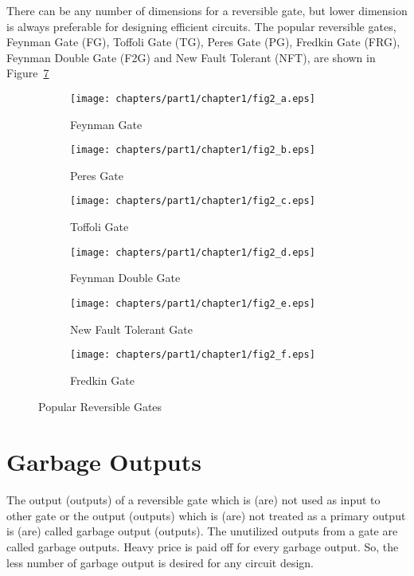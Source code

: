 \begin{example}\textnormal{
	There can be any number of dimensions for a reversible gate, but lower dimension is always preferable for designing efficient circuits. The popular reversible gates, Feynman Gate (FG), Toffoli Gate (TG), Peres Gate (PG), Fredkin Gate (FRG), Feynman Double Gate (F2G) and New Fault Tolerant (NFT), are shown in Figure~\ref{fig:p1_c1_fig2}}
\end{example}
\begin{figure}[H]
	\centering
	\begin{subfigure}[b]{0.30\textwidth}
		\centering
		\texttt{[image: chapters/part1/chapter1/fig2\_a.eps]}
		\caption{Feynman Gate}
		\label{fig:p1_c1_fig2_a}
	\end{subfigure}
	\begin{subfigure}[b]{0.30\textwidth}
		\centering
		\texttt{[image: chapters/part1/chapter1/fig2\_b.eps]}
		\caption{Peres Gate}
		\label{fig:p2_c1_fig2_b}
	\end{subfigure}
	\begin{subfigure}[b]{0.30\textwidth}
		\centering
		\texttt{[image: chapters/part1/chapter1/fig2\_c.eps]}
		\caption{Toffoli Gate}
		\label{fig:p1_c1_fig2_c}
	\end{subfigure}

\begin{subfigure}[b]{0.30\textwidth}
	\centering
	\texttt{[image: chapters/part1/chapter1/fig2\_d.eps]}
	\caption{Feynman Double Gate}
	\label{fig:p1_c1_fig2_d}
\end{subfigure}
\begin{subfigure}[b]{0.30\textwidth}
	\centering
	\texttt{[image: chapters/part1/chapter1/fig2\_e.eps]}
	\caption{New Fault Tolerant Gate}
	\label{fig:p1_c1_fig2_e}
\end{subfigure}
\begin{subfigure}[b]{0.30\textwidth}
	\centering
	\texttt{[image: chapters/part1/chapter1/fig2\_f.eps]}
	\caption{Fredkin Gate}
	\label{fig:p1_c1_fig2_f}
\end{subfigure}
	\caption{Popular Reversible Gates}
	\label{fig:p1_c1_fig2}
\end{figure}

\section{Garbage Outputs}

The  output (outputs)  of  a reversible  gate which is  (are)  not used as input to other gate or  the  output  (outputs) which is (are) not treated as a primary output is  (are) called garbage output (outputs). The unutilized outputs 
from a gate are called garbage outputs. Heavy price is paid
oﬀ for every garbage output. So, the less number of garbage output  is desired  for any circuit design.


